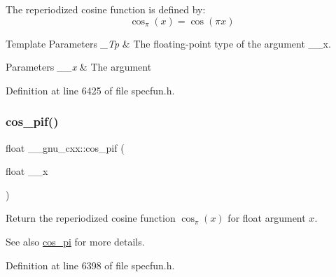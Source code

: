 The reperiodized cosine function is defined by\+: \[ \cos_\pi(x) = \cos(\pi x) \]


\begin{DoxyTemplParams}{Template Parameters}
{\em \+\_\+\+Tp} & The floating-\/point type of the argument {\ttfamily \+\_\+\+\_\+x}. \\
\hline
\end{DoxyTemplParams}

\begin{DoxyParams}{Parameters}
{\em \+\_\+\+\_\+x} & The argument \\
\hline
\end{DoxyParams}


Definition at line 6425 of file specfun.\+h.

\mbox{\label{group__gnu__math__spec__func_gaddcae99c1572af6fa1d79b9cfa053033}} 
\subsubsection{\texorpdfstring{cos\+\_\+pif()}{cos\_pif()}}
{\footnotesize\ttfamily float \+\_\+\+\_\+gnu\+\_\+cxx\+::cos\+\_\+pif (\begin{DoxyParamCaption}\item[{float}]{\+\_\+\+\_\+x }\end{DoxyParamCaption})\hspace{0.3cm}{\ttfamily [inline]}}

Return the reperiodized cosine function $ \cos_\pi(x) $ for {\ttfamily float} argument $ x $.

\begin{DoxySeeAlso}{See also}
\hyperlink{group__gnu__math__spec__func_gafc4698ae591b0e9e61285b0794d43ef4}{cos\+\_\+pi} for more details. 
\end{DoxySeeAlso}


Definition at line 6398 of file specfun.\+h.

\mbox{\label{group__gnu__math__spec__func_ga9b6816c0abf30fd88417d79a33cb5465}} 
